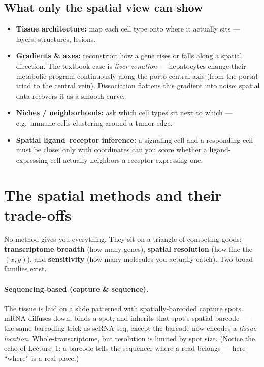 \documentclass[11pt]{article}
\begin{document}
\subsection{What only the spatial view can show}
\begin{itemize}[leftmargin=1.4em]
  \item \textbf{Tissue architecture:} map each cell type onto where it actually sits --- layers, structures,
        lesions.
  \item \textbf{Gradients \& axes:} reconstruct how a gene rises or falls along a spatial direction. The textbook
        case is \emph{liver zonation} --- hepatocytes change their metabolic program continuously along the
        porto-central axis (from the portal triad to the central vein). Dissociation flattens this gradient into
        noise; spatial data recovers it as a smooth curve.
  \item \textbf{Niches / neighborhoods:} ask which cell types sit next to which --- e.g.\ immune cells clustering
        around a tumor edge.
  \item \textbf{Spatial ligand--receptor inference:} a signaling cell and a responding cell must be close; only
        with coordinates can you score whether a ligand-expressing cell actually neighbors a receptor-expressing
        one.
\end{itemize}

\section{The spatial methods and their trade-offs}
No method gives you everything. They sit on a triangle of competing goods: \textbf{transcriptome breadth} (how many
genes), \textbf{spatial resolution} (how fine the $(x,y)$), and \textbf{sensitivity} (how many molecules you
actually catch). Two broad families exist.

\paragraph{Sequencing-based (capture \& sequence).}
The tissue is laid on a slide patterned with spatially-barcoded capture spots. mRNA diffuses down, binds a spot, and
inherits that spot's spatial barcode --- the same barcoding trick as scRNA-seq, except the barcode now encodes a
\emph{tissue location}. Whole-transcriptome, but resolution is limited by spot size. (Notice the echo of Lecture~1:
a barcode tells the sequencer where a read belongs --- here ``where'' is a real place.)
\end{document}
